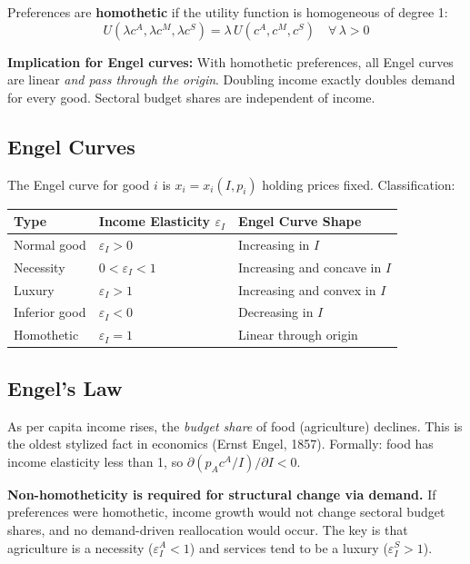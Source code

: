 \documentclass[a4paper,11pt]{article}
\begin{document}
Preferences are \textbf{homothetic} if the utility function is homogeneous of degree 1:
\[
U(\lambda c^A, \lambda c^M, \lambda c^S) = \lambda\, U(c^A, c^M, c^S) \quad \forall\, \lambda > 0
\]

\textbf{Implication for Engel curves:} With homothetic preferences, all Engel curves are linear \emph{and pass through the origin}. Doubling income exactly doubles demand for every good. Sectoral budget shares are independent of income.

\subsection*{Engel Curves}

The Engel curve for good $i$ is $x_i = x_i(I, p_i)$ holding prices fixed. Classification:

\begin{center}
\begin{tabular}{lll}
\toprule
\textbf{Type} & \textbf{Income Elasticity $\varepsilon_I$} & \textbf{Engel Curve Shape} \\
\midrule
Normal good & $\varepsilon_I > 0$ & Increasing in $I$ \\
Necessity & $0 < \varepsilon_I < 1$ & Increasing and concave in $I$ \\
Luxury & $\varepsilon_I > 1$ & Increasing and convex in $I$ \\
Inferior good & $\varepsilon_I < 0$ & Decreasing in $I$ \\
Homothetic & $\varepsilon_I = 1$ & Linear through origin \\
\bottomrule
\end{tabular}
\end{center}

\subsection*{Engel's Law}

As per capita income rises, the \emph{budget share} of food (agriculture) declines. This is the oldest stylized fact in economics (Ernst Engel, 1857). Formally: food has income elasticity less than 1, so $\partial (p_A c^A / I)/\partial I < 0$.

\begin{resultbox}
\textbf{Non-homotheticity is required for structural change via demand.} If preferences were homothetic, income growth would not change sectoral budget shares, and no demand-driven reallocation would occur. The key is that agriculture is a necessity ($\varepsilon_I^A < 1$) and services tend to be a luxury ($\varepsilon_I^S > 1$).
\end{resultbox}
\end{document}

